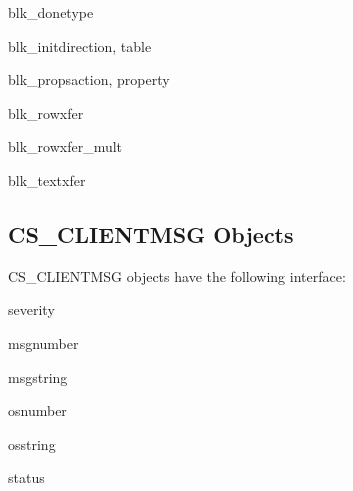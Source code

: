 \begin{methoddesc}[CS_BLKDESC]{blk_done}{type}
\end{methoddesc}

\begin{methoddesc}[CS_BLKDESC]{blk_init}{direction, table}
\end{methoddesc}

\begin{methoddesc}[CS_BLKDESC]{blk_props}{action, property }
\end{methoddesc}

\begin{methoddesc}[CS_BLKDESC]{blk_rowxfer}{}
\end{methoddesc}

\begin{methoddesc}[CS_BLKDESC]{blk_rowxfer_mult}{}
\end{methoddesc}

\begin{methoddesc}[CS_BLKDESC]{blk_textxfer}{}
\end{methoddesc}

\subsection{CS_CLIENTMSG Objects}

CS_CLIENTMSG objects have the following interface:

\begin{memberdesc}[CS_CLIENTMSG]{severity}
\end{memberdesc}

\begin{memberdesc}[CS_CLIENTMSG]{msgnumber}
\end{memberdesc}

\begin{memberdesc}[CS_CLIENTMSG]{msgstring}
\end{memberdesc}

\begin{memberdesc}[CS_CLIENTMSG]{osnumber}
\end{memberdesc}

\begin{memberdesc}[CS_CLIENTMSG]{osstring}
\end{memberdesc}

\begin{memberdesc}[CS_CLIENTMSG]{status}
\end{memberdesc}

